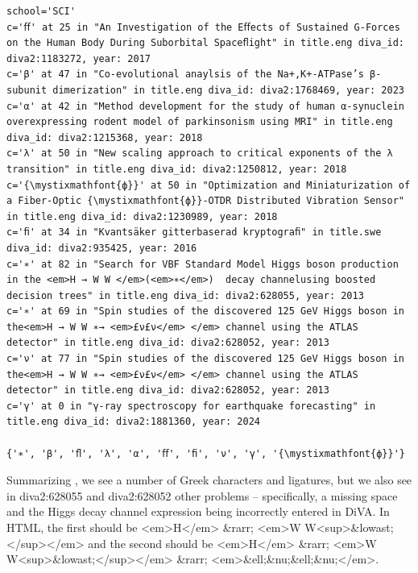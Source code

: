 \documentclass[12pt, twoside]{article}
\begin{document}
\begin{Verbatim}[breaklines=true, commandchars=\\\{\}]
school='SCI'
c='ﬀ' at 25 in "An Investigation of the Eﬀects of Sustained G-Forces on the Human Body During Suborbital Spaceﬂight" in title.eng diva_id: diva2:1183272, year: 2017
c='β' at 47 in "Co-evolutional anaylsis of the Na+,K+-ATPase’s β-subunit dimerization" in title.eng diva_id: diva2:1768469, year: 2023
c='α' at 42 in "Method development for the study of human α-synuclein overexpressing rodent model of parkinsonism using MRI" in title.eng diva_id: diva2:1215368, year: 2018
c='λ' at 50 in "New scaling approach to critical exponents of the λ transition" in title.eng diva_id: diva2:1250812, year: 2018
c='{\mystixmathfont{ф}}' at 50 in "Optimization and Miniaturization of a Fiber-Optic {\mystixmathfont{ф}}-OTDR Distributed Vibration Sensor" in title.eng diva_id: diva2:1230989, year: 2018
c='ﬁ' at 34 in "Kvantsäker gitterbaserad kryptograﬁ" in title.swe diva_id: diva2:935425, year: 2016
c='∗' at 82 in "Search for VBF Standard Model Higgs boson production in the <em>H → W W </em>(<em>∗</em>)  decay channelusing boosted decision trees" in title.eng diva_id: diva2:628055, year: 2013
c='∗' at 69 in "Spin studies of the discovered 125 GeV Higgs boson in the<em>H → W W ∗→ <em>£ν£ν</em> </em> channel using the ATLAS detector" in title.eng diva_id: diva2:628052, year: 2013
c='ν' at 77 in "Spin studies of the discovered 125 GeV Higgs boson in the<em>H → W W ∗→ <em>£ν£ν</em> </em> channel using the ATLAS detector" in title.eng diva_id: diva2:628052, year: 2013
c='γ' at 0 in "γ-ray spectroscopy for earthquake forecasting" in title.eng diva_id: diva2:1881360, year: 2024

{'∗', 'β', 'ﬂ', 'λ', 'α', 'ﬀ', 'ﬁ', 'ν', 'γ', '{\mystixmathfont{ф}}'}
\end{Verbatim}
\FloatBarrier
Summarizing , we see a number of Greek characters and ligatures, but we also see in diva2:628055 and diva2:628052 other problems -- specifically, a missing space and the Higgs decay channel expression being incorrectly entered in DiVA. In HTML, the first should be <em>H</em> \&rarr; <em>W W<sup>\&lowast;</sup></em> and the second should be <em>H</em> \&rarr; <em>W W<sup>\&lowast;</sup></em> \&rarr; <em>\&ell;\&nu;\&ell;\&nu;</em>.
\clearpage
\end{document}
